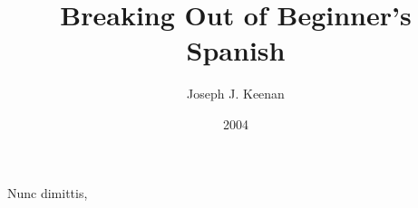 \documentclass[14pt,a4paper,oneside]{memoir}
\begin{document}
\frontmatter

\begin{titlingpage}
	\title{Breaking Out of Beginner's Spanish}
	\posttitle{\par\vskip1em{\normalfont\normalsize\maltese\par}\end{center}}
	\author{Joseph J. Keenan}
	\date{2004}

	\maketitle
\end{titlingpage}

\tableofcontents*



\mainmatter
















\backmatter



\begin{flushright}
	{\tiny{Nunc dimittis}, \DTMnow}
\end{flushright}
\end{document}
